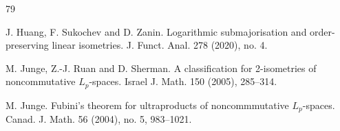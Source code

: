 \documentclass[leqno]{article} %
\numberwithin{equation}{section}
\begin{document}
\begin{thebibliography}{79}





J. Huang, F. Sukochev and D. Zanin.
\newblock Logarithmic submajorisation and order-preserving linear isometries.
\newblock J. Funct. Anal. 278 (2020), no. 4.


M. Junge, Z.-J. Ruan and D. Sherman.
\newblock A classification for 2-isometries of noncommutative $L_p$-spaces.
\newblock Israel J. Math. 150 (2005), 285--314.


M. Junge.
\newblock Fubini's theorem for ultraproducts of noncommmutative $L_p$-spaces.
\newblock Canad. J. Math. 56 (2004), no. 5, 983--1021.
%


\end{thebibliography}
\end{document}
